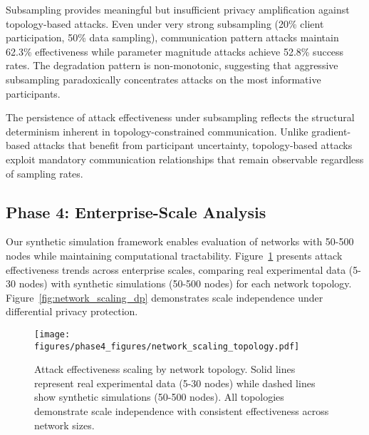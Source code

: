 Subsampling provides meaningful but insufficient privacy amplification against topology-based attacks. Even under very strong subsampling (20\% client participation, 50\% data sampling), communication pattern attacks maintain 62.3\% effectiveness while parameter magnitude attacks achieve 52.8\% success rates. The degradation pattern is non-monotonic, suggesting that aggressive subsampling paradoxically concentrates attacks on the most informative participants.

The persistence of attack effectiveness under subsampling reflects the structural determinism inherent in topology-constrained communication. Unlike gradient-based attacks that benefit from participant uncertainty, topology-based attacks exploit mandatory communication relationships that remain observable regardless of sampling rates.

\subsection{Phase 4: Enterprise-Scale Analysis}

Our synthetic simulation framework enables evaluation of networks with 50-500 nodes while maintaining computational tractability. Figure~\ref{fig:network_scaling_topology} presents attack effectiveness trends across enterprise scales, comparing real experimental data (5-30 nodes) with synthetic simulations (50-500 nodes) for each network topology. Figure~\ref{fig:network_scaling_dp} demonstrates scale independence under differential privacy protection.

\begin{figure}[!t]
\centering
\texttt{[image: figures/phase4\_figures/network\_scaling\_topology.pdf]}
\caption{Attack effectiveness scaling by network topology. Solid lines represent real experimental data (5-30 nodes) while dashed lines show synthetic simulations (50-500 nodes). All topologies demonstrate scale independence with consistent effectiveness across network sizes.}
\label{fig:network_scaling_topology}
\end{figure}

